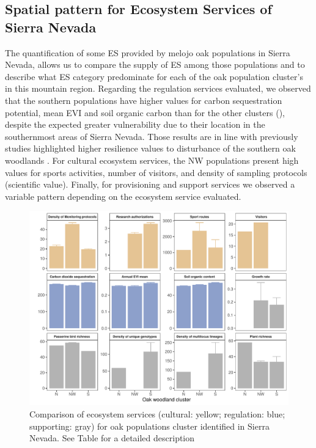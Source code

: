 \subsection{Spatial pattern for Ecosystem Services of Sierra Nevada}\label{sec:es:spatial} 

The quantification of some ES provided by melojo oak populations in Sierra Nevada, allows us to compare the supply of ES among those populations and to describe what ES category predominate for each of the oak population cluster’s in this mountain region. Regarding the regulation services evaluated, we observed that the southern populations have higher values for carbon sequestration potential, mean EVI and soil organic carbon than for the other clusters (), despite the expected greater vulnerability due to their location in the southernmost areas of Sierra Nevada. Those results are in line with previously studies highlighted higher resilience values to disturbance of the southern oak woodlands \autocites{PerezLuqueetal2020LanduseLegacies}. For cultural ecosystem services, the NW populations present high values for sports activities, number of visitors, and density of sampling protocols (scientific value). Finally, for provisioning and support services we observed a variable pattern depending on the ecosystem service evaluated. 

\begin{figure}
    \centering
    \includegraphics[width=\textwidth]{img/es/es-plotSN.pdf}\caption{Comparison of ecosystem services (cultural: yellow; regulation: blue; supporting: gray) for oak populations cluster identified in Sierra Nevada. See Table  for a detailed description 
}\label{fig:es:oak-compare}
\end{figure}

